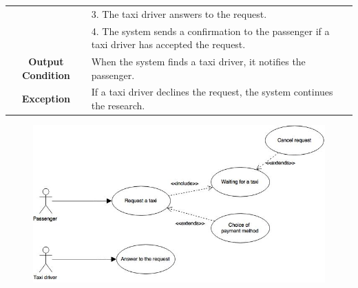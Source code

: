 \documentclass[18pt,oneside,a4paper, titlepage]{article}
\begin{document}
\begin{itemize}
\begin{center}
\begin{tabular}{|c|p{8cm}|}
					& 3. The taxi driver answers to the request.\\
					& 4. The system sends a confirmation to the passenger if a taxi driver has accepted the request. \\
					\hline \textbf{Output Condition} & When the system finds a taxi driver, it notifies the passenger.\\
					\hline \textbf{Exception} & If a taxi driver declines the request, the system continues the research.\\
					\hline
				\end{tabular}
				\vspace{1cm}
				\begin{figure}[h]
					\centering
					\includegraphics[scale=0.6]{Diagrams/UseCaseRequest.jpg}
				\end{figure}
			\end{center}
			
			\newpage
			

\end{itemize}
\end{document}
